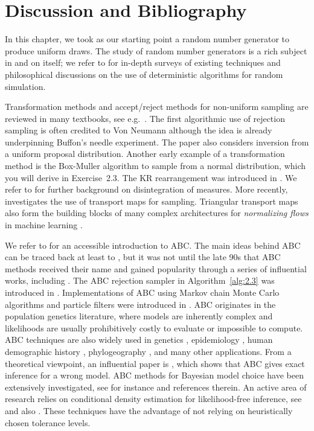 \section{Discussion and Bibliography}
\label{sec:2.3}

In this chapter, we took as our starting point a random number generator to produce uniform
draws. The study of random number generators is a rich subject in and on itself; we refer to
\cite{83,127,136} for in-depth surveys of existing techniques and philosophical discussions on the
use of deterministic algorithms for random simulation.

Transformation methods and accept/reject methods for non-uniform sampling are reviewed
in many textbooks, see e.g.\ \cite{56,193}. The first algorithmic use of rejection sampling is often
credited to Von Neumann \cite{232} although the idea is already underpinning Buffon's needle experiment. The paper \cite{232} also considers inversion from a uniform proposal distribution. Another
early example of a transformation method is the Box-Muller algorithm \cite{33} to sample from a
normal distribution, which you will derive in Exercise~2.3. The KR rearrangement was introduced in \cite{126,204}. We refer to \cite{7} for further background on disintegration of measures. More
recently, \cite{157} investigates the use of transport maps for sampling. Triangular transport maps
also form the building blocks of many complex architectures for \textit{normalizing flows} in machine
learning \cite{181}.

We refer to \cite{227} for an accessible introduction to ABC. The main ideas behind ABC can
be traced back at least to \cite{205}, but it was not until the late 90s that ABC methods received
their name and gained popularity through a series of influential works, including \cite{224,188,18}.
The ABC rejection sampler in Algorithm~\ref{alg:2.3} was introduced in \cite{188}. Implementations of ABC
using Markov chain Monte Carlo algorithms and particle filters were introduced in \cite{155,214}.
ABC originates in the population genetics literature, where models are inherently complex and
likelihoods are usually prohibitively costly to evaluate or impossible to compute. ABC techniques are also widely used in genetics \cite{235,213,75}, epidemiology \cite{223}, human demographic
history \cite{104}, phylogeography \cite{19}, and many other applications. From a theoretical viewpoint,
an influential paper is \cite{238}, which shows that ABC gives exact inference for a wrong model.
ABC methods for Bayesian model choice have been extensively investigated, see for instance
\cite{195} and references therein. An active area of research relies on conditional density estimation
for likelihood-free inference, see \cite{180} and also \cite{182}. These techniques have the advantage of
not relying on heuristically chosen tolerance levels.
